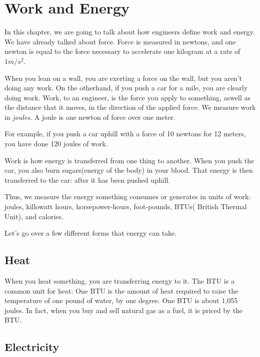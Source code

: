 \chapter{Work and Energy}

In this chapter, we are going to talk about how engineers define work
and energy.  We have already talked about force. Force is measured in
newtons, and one newton is equal to the force necessary to accelerate one
kilogram at a rate of $1 m/s^2$.

When you lean on a wall, you are exerting a force on the wall, but you
aren't doing any work. On the otherhand, if you push a car for a mile,
you are clearly doing work. Work, to an engineer, is the force you
apply to something, aswell as the distance that it moves, in the direction
of the applied force. We measure work in \textit{joules}. A joule is one
newton of force over one meter.

For example, if you push a car uphill with a force of 10 newtons for 12
meters, you have done 120 joules of work.

Work is how energy is transferred from one thing to another. When you
push the car, you also burn sugars(energy of the body) in your blood. That energy is then
transferred to the car: after it has been pushed uphill.

Thus, we measure the energy something consumes or generates in 
units of work: joules, killowatt hours, horsepower-hours, foot-pounds,
BTUs( British Thermal Unit), and calories.

Let's go over a few different forms that energy can take.
\section{Heat}

When you heat something, you are transferring energy to it. The BTU
 is a common unit for heat: One BTU is the
amount of heat required to raise the temperature of one pound of water,
by one degree. One BTU is about 1,055 joules. In fact, when you buy and sell
natural gas as a fuel, it is priced by the BTU. 

\section{Electricity}


